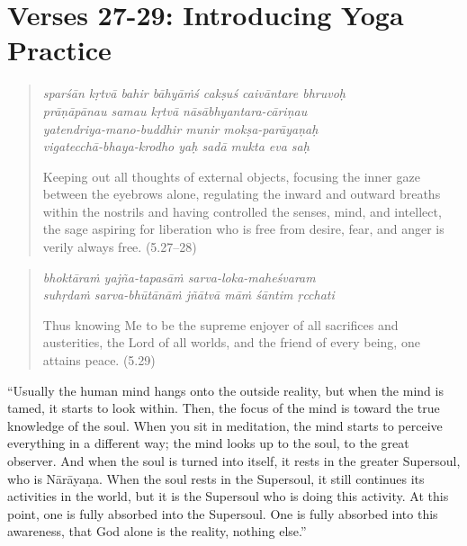 \documentclass[12pt, twoside, openright]{memoir}
\begin{document}
\section{Verses 27-29: Introducing Yoga Practice}\label{sec-verses-27-29-introducing-yoga-practice}


\par
\begin{verse}
\textit{sparśān kṛtvā bahir bāhyāṁś cakṣuś caivāntare bhruvoḥ} \\
\textit{prāṇāpānau samau kṛtvā nāsābhyantara-cāriṇau} \\
\textit{yatendriya-mano-buddhir munir mokṣa-parāyaṇaḥ} \\
\textit{vigatecchā-bhaya-krodho yaḥ sadā mukta eva saḥ}

\noindent Keeping out all thoughts of external objects, focusing the inner gaze between the eyebrows alone, regulating the inward and outward breaths within the nostrils and having controlled the senses, mind, and intellect, the sage aspiring for liberation who is free from desire, fear, and anger is verily always free. (5.27–28)
\end{verse}
\par



\par
\begin{verse}
\textit{bhoktāraṁ yajña-tapasāṁ sarva-loka-maheśvaram} \\
\textit{suhṛdaṁ sarva-bhūtānāṁ jñātvā māṁ śāntim ṛcchati}

\noindent Thus knowing Me to be the supreme enjoyer of all sacrifices and austerities, the Lord of all worlds, and the friend of every being, one attains peace. (5.29)
\end{verse}
\par


\enquote{Usually the human mind hangs onto the outside reality, but when the mind is tamed, it starts to look within. Then, the focus of the mind is toward the true knowledge of the soul. When you sit in meditation, the mind starts to perceive everything in a different way; the mind looks up to the soul, to the great observer. And when the soul is turned into itself, it rests in the greater Supersoul, who is Nārāyaṇa. When the soul rests in the Supersoul, it still continues its activities in the world, but it is the Supersoul who is doing this activity. At this point, one is fully absorbed into the Supersoul. One is fully absorbed into this awareness, that God alone is the reality, nothing else.}
\end{document}
